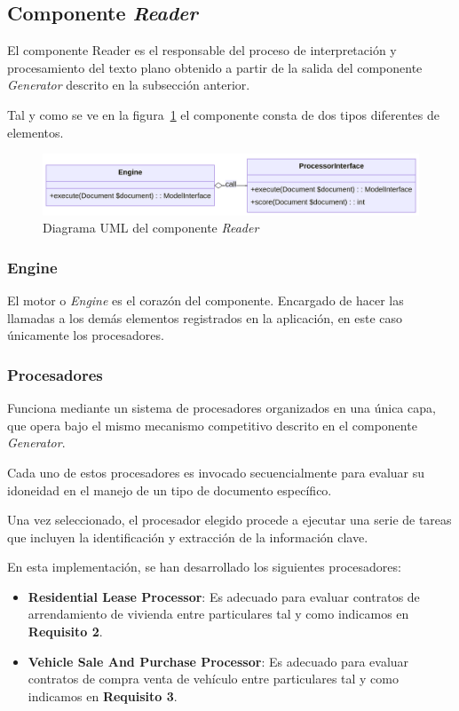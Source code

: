\subsection*{Componente \textit{Reader}}\label{subsec:chapter_4.reader_component}
El componente Reader es el responsable del proceso de interpretación y procesamiento del texto plano obtenido a
partir de la salida del componente \textit{Generator} descrito en la subsección anterior.

Tal y como se ve en la figura~\ref{fig:chapter_4.reader_component_uml} el componente consta de dos tipos diferentes de
elementos.

\begin{figure}[ht]
    \begin{center}
        \includegraphics[width=\textwidth]{./chapter/4/images/chapter_4.reader_component_uml}
        \caption{Diagrama UML del componente \textit{Reader}}
        \label{fig:chapter_4.reader_component_uml}
    \end{center}
\end{figure}

\subsubsection*{Engine}
El motor o \textit{Engine} es el corazón del componente.
Encargado de hacer las llamadas a los demás elementos registrados en la aplicación, en este caso únicamente los
procesadores.

\subsubsection*{Procesadores}
Funciona mediante un sistema de procesadores organizados en una única capa, que opera bajo el mismo mecanismo
competitivo descrito en el componente \textit{Generator}.

Cada uno de estos procesadores es invocado secuencialmente para evaluar su idoneidad en el manejo de un tipo de documento
específico.

Una vez seleccionado, el procesador elegido procede a ejecutar una serie de tareas que incluyen la identificación y
extracción de la información clave.

En esta implementación, se han desarrollado los siguientes procesadores:

\begin{itemize}
    \item \textbf{Residential Lease Processor}: Es adecuado para evaluar contratos de arrendamiento de vivienda entre
    particulares tal y como indicamos en \textbf{Requisito 2}.
    \item \textbf{Vehicle Sale And Purchase Processor}: Es adecuado para evaluar contratos de compra venta de vehículo
    entre particulares tal y como indicamos en \textbf{Requisito 3}.
\end{itemize}
